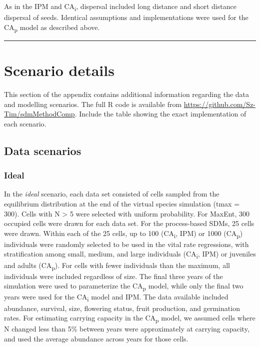 \documentclass[]{article}
\begin{document}
As in the IPM and CA\textsubscript{i}, dispersal included long distance
and short distance dispersal of seeds. Identical assumptions and
implementations were used for the CA\textsubscript{p} model as described
above.

\begin{center}\rule{0.5\linewidth}{\linethickness}\end{center}

\newpage
\section{Scenario details}

This section of the appendix contains additional information regarding
the data and modelling scenarios. The full R code is available from
\url{https://github.com/Sz-Tim/sdmMethodComp}. Include the table showing
the exact implementation of each scenario.

\subsection{Data scenarios}
\subsubsection{Ideal}

In the \emph{ideal} scenario, each data set consisted of cells sampled
from the equilibrium distribution at the end of the virtual species
simulation (tmax = 300). Cells with N \textgreater{} 5 were selected
with uniform probability. For MaxEnt, 300 occupied cells were drawn for
each data set. For the process-based SDMs, 25 cells were drawn. Within
each of the 25 cells, up to 100 (CA\textsubscript{i}, IPM) or 1000
(CA\textsubscript{p}) individuals were randomly selected to be used in
the vital rate regressions, with stratification among small, medium, and
large individuals (CA\textsubscript{i}, IPM) or juveniles and adults
(CA\textsubscript{p}). For cells with fewer individuals than the
maximum, all individuals were included regardless of size. The final
three years of the simulation were used to parameterize the
CA\textsubscript{p} model, while only the final two years were used for
the CA\textsubscript{i} model and IPM. The data available included
abundance, survival, size, flowering status, fruit production, and
germination rates. For estimating carrying capacity in the
CA\textsubscript{p} model, we assumed cells where N changed less than
5\% between years were approximately at carrying capacity, and used the
average abundance across years for those cells.
\end{document}
